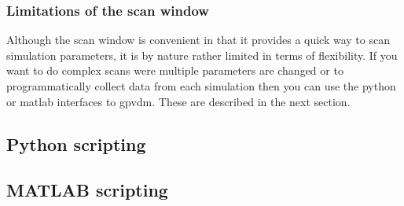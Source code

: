 \subsubsection{Limitations of the scan window}
Although the scan window is convenient in that it provides a quick way to scan simulation parameters, it is by nature rather limited in terms of flexibility. If you want to do complex scans were multiple parameters are changed or to programmatically collect data from each simulation then you can use the python or matlab interfaces to gpvdm.  These are described in the next section.

\newpage
\subsection{Python scripting}
\label{sec:pythonscripts}

\newpage
\subsection{MATLAB scripting}
\label{sec:matlabscripts}

